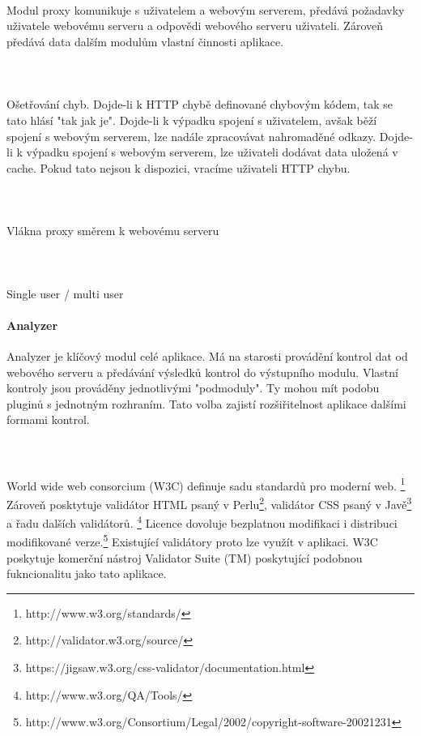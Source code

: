 \documentclass[10pt]{article}
\begin{document}
	\paragraph{~} Modul proxy komunikuje s uživatelem a webovým  serverem, předává požadavky uživatele webovému serveru a odpovědi webového serveru uživateli. Zároveň předává data dalším modulům vlastní činnosti aplikace.
	\paragraph{~}Ošetřování chyb. Dojde-li k HTTP chybě definované chybovým kódem, tak se tato hlásí "tak jak je". Dojde-li k výpadku spojení s uživatelem, avšak běží spojení s webovým serverem, lze nadále zpracovávat nahromaděné odkazy. Dojde-li k výpadku spojení s webovým serverem, lze uživateli dodávat data uložená v cache. Pokud tato nejsou k dispozici, vracíme uživateli HTTP chybu.
	\paragraph{~}Vlákna proxy směrem k webovému serveru
	\paragraph{~}Single user / multi user
	\paragraph{Analyzer} Analyzer je klíčový modul celé aplikace. Má na starosti provádění kontrol dat od webového serveru a předávání výsledků kontrol do výstupního modulu. Vlastní kontroly jsou prováděny jednotlivými "podmoduly". Ty mohou mít podobu pluginů s jednotným rozhraním. Tato volba zajistí rozšiřitelnost aplikace dalšími formami kontrol. 
	\paragraph{~}World wide web consorcium (W3C)  definuje sadu standardů pro moderní web. \footnote{http://www.w3.org/standards/} Zároveň posktytuje validátor HTML psaný v Perlu\footnote{http://validator.w3.org/source/}, validátor CSS psaný v Javě\footnote{https://jigsaw.w3.org/css-validator/documentation.html} a řadu dalších validátorů. \footnote{http://www.w3.org/QA/Tools/} Licence dovoluje bezplatnou modifikaci i distribuci modifikované verze.\footnote{http://www.w3.org/Consortium/Legal/2002/copyright-software-20021231} Existující validátory proto lze využít v aplikaci. W3C poskytuje komerční nástroj Validator Suite (TM) poskytující podobnou fukncionalitu jako tato aplikace.
\end{document}
